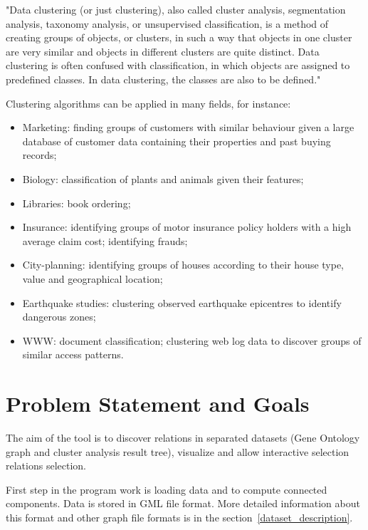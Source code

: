 \documentclass[a4paper,oneside]{article}
\begin{document}
"Data clustering (or just clustering), also called cluster analysis, segmentation analysis, taxonomy analysis, or unsupervised classification, is a method of creating groups of objects, or clusters, in such a way that objects in one cluster are very similar and objects in different clusters are quite distinct. Data clustering is often confused with classification, in which objects are assigned to predefined classes. In data clustering, the classes are also to be defined."~\cite{data_clustering_book}


Clustering algorithms can be applied in many fields, for instance:

\begin{itemize}
\item Marketing: finding groups of customers with similar behaviour given a large database of customer data containing their properties and past buying records;
\item Biology: classification of plants and animals given their features;
\item Libraries: book ordering;
\item Insurance: identifying groups of motor insurance policy holders with a high average claim cost; identifying frauds;
\item City-planning: identifying groups of houses according to their house type, value and geographical location;
\item Earthquake studies: clustering observed earthquake epicentres to identify dangerous zones;
\item WWW: document classification; clustering web log data to discover groups of similar access patterns.
\end{itemize}

\section{Problem Statement and Goals}
\label{problem_statement_and_goals}
The aim of the tool is to discover relations in separated datasets (Gene Ontology graph and cluster analysis result tree), visualize and allow interactive selection relations selection.


First step in the program work is loading data and to compute connected components. Data is stored in GML file format. More detailed information about this format and other graph file formats is in the section~\ref{dataset_description}.
\end{document}
